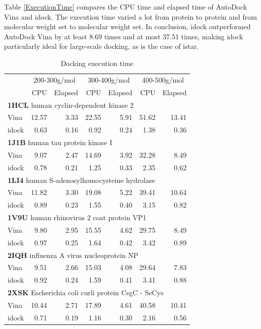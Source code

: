 Table \ref{ExecutionTime} compares the CPU time and elapsed time of AutoDock Vina and idock. The execution time varied a lot from protein to protein and from molecular weight set to molecular weight set. In conclusion, idock outperformed AutoDock Vina by at least 8.69 times and at most 37.51 times, making idock particularly ideal for large-scale docking, as is the case of istar.

\begin{table}
\caption{Docking execution time}
\begin{tabular}{lrrrrrr}
\hline
& \multicolumn{2}{c}{200-300g/mol} & \multicolumn{2}{c}{300-400g/mol} & \multicolumn{2}{c}{400-500g/mol}\\
& CPU & Elapsed & CPU & Elapsed & CPU & Elapsed\\
\hline
\multicolumn{7}{l}{\textbf{1HCL} human cyclin-dependent kinase 2}\\
Vina  & 12.57 &  3.33 & 22.55 &  5.91 & 51.62 & 13.41\\
idock &  0.63 &  0.16 &  0.92 &  0.24 &  1.38 &  0.36\\
\multicolumn{7}{l}{\textbf{1J1B} human tau protein kinase I}\\
Vina  &  9.07 &  2.47 & 14.69 &  3.92 & 32.28 &  8.49\\
idock &  0.78 &  0.21 &  1.25 &  0.33 &  2.35 &  0.62\\
\multicolumn{7}{l}{\textbf{1LI4} human S-adenosylhomocysteine hydrolase}\\
Vina  & 11.82 &  3.30 & 19.08 &  5.22 & 39.41 & 10.64\\
idock &  0.89 &  0.23 &  1.55 &  0.40 &  3.15 &  0.82\\
\multicolumn{7}{l}{\textbf{1V9U} human rhinovirus 2 coat protein VP1}\\
Vina  &  9.80 &  2.95 & 15.55 &  4.62 & 29.75 &  8.49\\
idock &  0.97 &  0.25 &  1.64 &  0.42 &  3.42 &  0.89\\
\multicolumn{7}{l}{\textbf{2IQH} influenza A virus nucleoprotein NP}\\
Vina  &  9.51 &  2.66 & 15.03 &  4.08 & 29.64 &  7.83\\
idock &  0.92 &  0.24 &  1.59 &  0.41 &  3.41 &  0.88\\
\multicolumn{7}{l}{\textbf{2XSK} Escherichia coli curli protein CsgC - SeCys}\\
Vina  & 10.44 &  2.71 & 17.89 &  4.61 & 40.58 & 10.41\\
idock &  0.71 &  0.19 &  1.16 &  0.30 &  2.16 &  0.56\\

\end{tabular}
\end{table}
